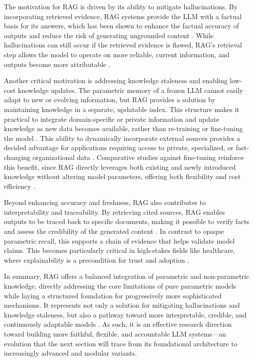 \documentclass[11pt]{article}
\begin{document}
The motivation for RAG is driven by its ability to mitigate hallucinations. By incorporating retrieved evidence, RAG systems provide the LLM with a factual basis for its answers, which has been shown to enhance the factual accuracy of outputs and reduce the risk of generating ungrounded content \cite{ref22,ref26,ref27}. While hallucinations can still occur if the retrieved evidence is flawed, RAG's retrieval step allows the model to operate on more reliable, current information, and outputs become more attributable \cite{ref28,ref26}.

Another critical motivation is addressing knowledge staleness and enabling low-cost knowledge updates. The parametric memory of a frozen LLM cannot easily adapt to new or evolving information, but RAG provides a solution by maintaining knowledge in a separate, updatable index. This structure makes it practical to integrate domain-specific or private information and update knowledge as new data becomes available, rather than re-training or fine-tuning the model \cite{ref23,ref29}. This ability to dynamically incorporate external sources provides a decided advantage for applications requiring access to private, specialized, or fast-changing organizational data \cite{ref22}. Comparative studies against fine-tuning reinforce this benefit, since RAG directly leverages both existing and newly introduced knowledge without altering model parameters, offering both flexibility and cost efficiency \cite{ref30,ref25}.

Beyond enhancing accuracy and freshness, RAG also contributes to interpretability and traceability. By retrieving cited sources, RAG enables outputs to be traced back to specific documents, making it possible to verify facts and assess the credibility of the generated content \cite{ref31,ref22}. In contrast to opaque parametric recall, this supports a chain of evidence that helps validate model claims. This becomes particularly critical in high-stakes fields like healthcare, where explainability is a precondition for trust and adoption \cite{ref32}.

In summary, RAG offers a balanced integration of parametric and non-parametric knowledge, directly addressing the core limitations of pure parametric models while laying a structured foundation for progressively more sophisticated mechanisms. It represents not only a solution for mitigating hallucinations and knowledge staleness, but also a pathway toward more interpretable, credible, and continuously adaptable models \cite{ref22,ref33}. As such, it is an effective research direction toward building more faithful, flexible, and accountable LLM systems---an evolution that the next section will trace from its foundational architecture to increasingly advanced and modular variants.
\end{document}
